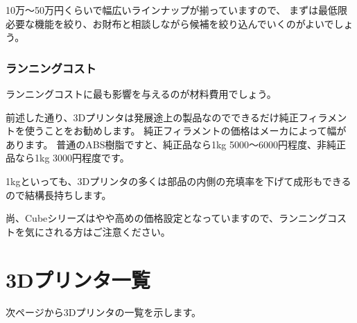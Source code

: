 10万～50万円くらいで幅広いラインナップが揃っていますので、
まずは最低限必要な機能を絞り、お財布と相談しながら候補を絞り込んでいくのがよいでしょう。

\subsubsection{ランニングコスト}\label{ux30e9ux30f3ux30cbux30f3ux30b0ux30b3ux30b9ux30c8}

ランニングコストに最も影響を与えるのが材料費用でしょう。

前述した通り、3Dプリンタは発展途上の製品なのでできるだけ純正フィラメントを使うことをお勧めします。
純正フィラメントの価格はメーカによって幅があります。
普通のABS樹脂ですと、純正品なら1kg 5000～6000円程度、非純正品なら1kg
3000円程度です。

1kgといっても、3Dプリンタの多くは部品の内側の充填率を下げて成形もできるので結構長持ちします。

尚、Cubeシリーズはやや高めの価格設定となっていますので、ランニングコストを気にされる方はご注意ください。

\section{3Dプリンタ一覧}\label{dux30d7ux30eaux30f3ux30bfux4e00ux89a7}

次ページから3Dプリンタの一覧を示します。

\clearpage

